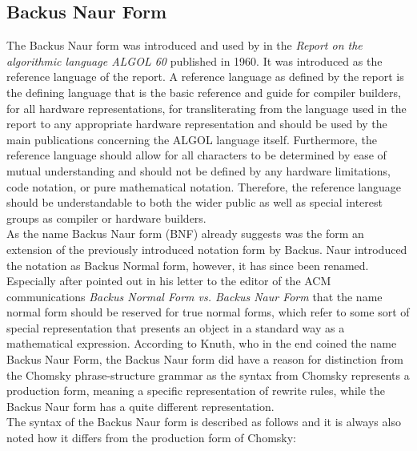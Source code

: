 \documentclass{article}
\begin{document}
\subsection{Backus Naur Form}
The Backus Naur form was introduced and used by \citet{backus1960report} in the \textit{Report on the algorithmic language ALGOL 60} published in 1960. It was introduced as the reference language of the report. A reference language as defined by the report is the defining language that is the basic reference and guide for compiler builders, for all hardware representations, for transliterating from the language used in the report to any appropriate hardware representation and should be used by the main publications concerning the ALGOL language itself. Furthermore, the reference language should allow for all characters to be determined by ease of mutual understanding and should not be defined by any hardware limitations, code notation, or pure mathematical notation. Therefore, the reference language should be understandable to both the wider public as well as special interest groups as compiler or hardware builders. 
\\
As the name Backus Naur form (BNF) already suggests was the form an extension of the previously introduced notation form by Backus.  Naur introduced the notation as Backus Normal form, however, it has since been renamed. Especially after \citet{knuth-ba} pointed out in his letter to the editor of the ACM communications \textit{Backus Normal Form vs. Backus Naur Form} that the name normal form should be reserved for true normal forms, which refer to some sort of special representation that presents an object in a standard way as a mathematical expression. According to Knuth, who in the end coined the name Backus Naur Form, the Backus Naur form did have a reason for distinction from the Chomsky phrase-structure grammar as the syntax from Chomsky represents a production form, meaning a specific representation of rewrite rules, while the Backus Naur form has a quite different representation.
\\
The syntax of the Backus Naur form is described as follows and it is always also noted how it differs from the production form of Chomsky:
\end{document}
